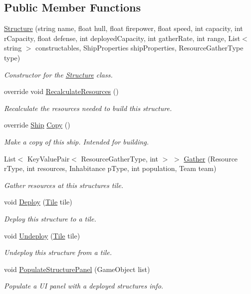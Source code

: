 \subsection*{Public Member Functions}
\begin{DoxyCompactItemize}
\item 
\hyperlink{class_structure_a792dfc745239398bdea2ebdd8dd48233}{Structure} (string name, float hull, float firepower, float speed, int capacity, int r\+Capacity, float defense, int deployed\+Capacity, int gather\+Rate, int range, List$<$ string $>$ constructables, Ship\+Properties ship\+Properties, Resource\+Gather\+Type type)
\begin{DoxyCompactList}\small\item\em Constructor for the \hyperlink{class_structure}{Structure} class. \end{DoxyCompactList}\item 
override void \hyperlink{class_structure_ab88e4905beed6a2caafe1b7cbfc109b7}{Recalculate\+Resources} ()
\begin{DoxyCompactList}\small\item\em Recalculate the resources needed to build this structure. \end{DoxyCompactList}\item 
override \hyperlink{class_ship}{Ship} \hyperlink{class_structure_ae96b383348aca0ba43c2a57496b1761c}{Copy} ()
\begin{DoxyCompactList}\small\item\em Make a copy of this ship. Intended for building. \end{DoxyCompactList}\item 
List$<$ Key\+Value\+Pair$<$ Resource\+Gather\+Type, int $>$ $>$ \hyperlink{class_structure_a61847ddf27249ffba7a905010aaf1c4d}{Gather} (Resource r\+Type, int resources, Inhabitance p\+Type, int population, Team team)
\begin{DoxyCompactList}\small\item\em Gather resources at this structure\textquotesingle{}s tile. \end{DoxyCompactList}\item 
void \hyperlink{class_structure_af20a7802b5040cbe4f478b74ad95f57d}{Deploy} (\hyperlink{class_tile}{Tile} tile)
\begin{DoxyCompactList}\small\item\em Deploy this structure to a tile. \end{DoxyCompactList}\item 
void \hyperlink{class_structure_ae04874fbb3f76ac90dcdd880d94b258c}{Undeploy} (\hyperlink{class_tile}{Tile} tile)
\begin{DoxyCompactList}\small\item\em Undeploy this structure from a tile. \end{DoxyCompactList}\item 
void \hyperlink{class_structure_ad7d795f89739631a8bdad29ef6d1900e}{Populate\+Structure\+Panel} (Game\+Object list)
\begin{DoxyCompactList}\small\item\em Populate a U\+I panel with a deployed structure\textquotesingle{}s info. \end{DoxyCompactList}\end{DoxyCompactItemize}
